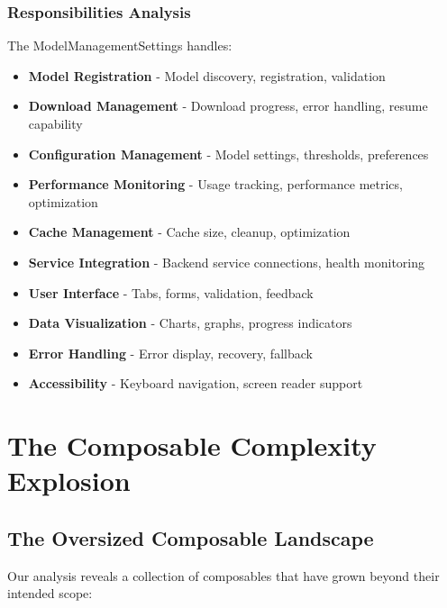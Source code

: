 \documentclass[11pt]{article}
\begin{document}
\subsubsection{Responsibilities Analysis}

The ModelManagementSettings handles:

\begin{itemize}
\item \textbf{Model Registration} - Model discovery, registration, validation
\item \textbf{Download Management} - Download progress, error handling, resume capability
\item \textbf{Configuration Management} - Model settings, thresholds, preferences
\item \textbf{Performance Monitoring} - Usage tracking, performance metrics, optimization
\item \textbf{Cache Management} - Cache size, cleanup, optimization
\item \textbf{Service Integration} - Backend service connections, health monitoring
\item \textbf{User Interface} - Tabs, forms, validation, feedback
\item \textbf{Data Visualization} - Charts, graphs, progress indicators
\item \textbf{Error Handling} - Error display, recovery, fallback
\item \textbf{Accessibility} - Keyboard navigation, screen reader support
\end{itemize}

\section{The Composable Complexity Explosion}

\subsection{The Oversized Composable Landscape}

Our analysis reveals a collection of composables that have grown beyond their intended scope:
\end{document}
